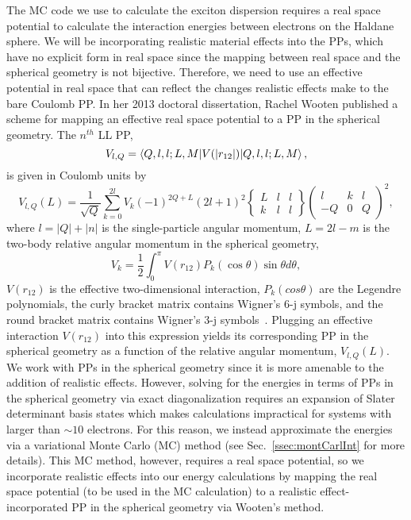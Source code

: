     The MC code we use to calculate the exciton dispersion requires a real space potential to calculate the interaction energies between electrons on the Haldane sphere. We will be incorporating realistic material effects into the PPs, which have no explicit form in real space since the mapping between real space and the spherical geometry is not bijective. Therefore, we need to use an effective potential in real space that can reflect the changes realistic effects make to the bare Coulomb PP. In her 2013 doctoral dissertation, Rachel Wooten published a scheme for mapping an effective real space potential to a PP in the spherical geometry. The $n^{th}$ LL PP,
    \begin{equation} \label{wootPpNthLl}
    V_{l,Q}=\braket{Q,l,l;L,M|V(|r_{12}|)|Q,l,l;L,M},
    \end{equation}
    is given in Coulomb units by
    \begin{equation} \label{wootPp}
    V_{l,Q}(L)=\frac{1}{\sqrt{Q}}\sum_{k=0}^{2l}V_k(-1)^{2Q+L}(2l+1)^2
    \begin{Bmatrix}
    L & l & l\\
    k & l & l
    \end{Bmatrix}
    \begin{pmatrix}
    l & k & l\\
    -Q & 0 & Q
    \end{pmatrix}
    ^2,
    \end{equation}
    where $l=|Q|+|n|$ is the single-particle angular momentum, $L=2l-m$ is the two-body relative angular momentum in the spherical geometry,
    \begin{equation} \label{wootPpVk}
    V_k=\frac{1}{2}\int_0^\pi V(r_{12})P_k(\cos\theta)\sin\theta d\theta,
    \end{equation}
    $V(r_{12})$ is the effective two-dimensional interaction, $P_k(cos\theta)$ are the Legendre polynomials, the curly bracket matrix contains Wigner's 6-j symbols, and the round bracket matrix contains Wigner's 3-j symbols~\cite{wooten}. Plugging an effective interaction $V(r_{12})$ into this expression yields its corresponding PP in the spherical geometry as a function of the relative angular momentum, $V_{l,Q}(L)$. We work with PPs in the spherical geometry since it is more amenable to the addition of realistic effects. However, solving for the energies in terms of PPs in the spherical geometry via exact diagonalization requires an expansion of Slater determinant basis states which makes calculations impractical for systems with larger than $\sim10$ electrons. For this reason, we instead approximate the energies via a variational Monte Carlo (MC) method (see Sec.~\ref{ssec:montCarlInt} for more details). This MC method, however, requires a real space potential, so we incorporate realistic effects into our energy calculations by mapping the real space potential (to be used in the MC calculation) to a realistic effect-incorporated PP in the spherical geometry via Wooten's method.
    
